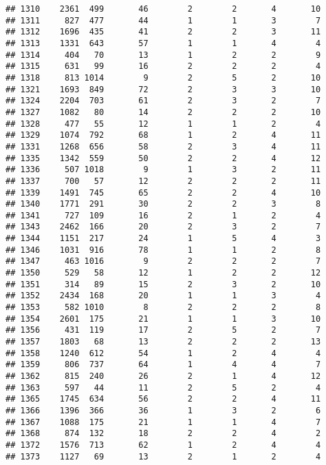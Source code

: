 \documentclass[]{article}
\begin{document}
\begin{verbatim}
## 1310    2361  499       46        2        2       4       10
## 1311     827  477       44        1        1       3        7
## 1312    1696  435       41        2        2       3       11
## 1313    1331  643       57        1        1       4        4
## 1314     404   70       13        1        2       2        9
## 1315     631   99       16        2        2       2        4
## 1318     813 1014        9        2        5       2       10
## 1321    1693  849       72        2        3       3       10
## 1324    2204  703       61        2        3       2        7
## 1327    1082   80       14        2        2       2       10
## 1328     477   55       12        1        1       2        4
## 1329    1074  792       68        1        2       4       11
## 1331    1268  656       58        2        3       4       11
## 1335    1342  559       50        2        2       4       12
## 1336     507 1018        9        1        3       2       11
## 1337     700   57       12        2        2       2       11
## 1339    1491  745       65        2        2       4       10
## 1340    1771  291       30        2        2       3        8
## 1341     727  109       16        2        1       2        4
## 1343    2462  166       20        2        3       2        7
## 1344    1151  217       24        1        5       4        3
## 1346    1031  916       78        1        1       2        8
## 1347     463 1016        9        2        2       2        7
## 1350     529   58       12        1        2       2       12
## 1351     314   89       15        2        3       2       10
## 1352    2434  168       20        1        1       3        4
## 1353     582 1010        8        2        2       2        8
## 1354    2601  175       21        1        1       3       10
## 1356     431  119       17        2        5       2        7
## 1357    1803   68       13        2        2       2       13
## 1358    1240  612       54        1        2       4        4
## 1359     806  737       64        1        4       4        7
## 1362     815  240       26        2        1       4       12
## 1363     597   44       11        2        5       2        4
## 1365    1745  634       56        2        2       4       11
## 1366    1396  366       36        1        3       2        6
## 1367    1088  175       21        1        1       4        7
## 1368     874  132       18        2        2       4        2
## 1372    1576  713       62        1        2       4        4
## 1373    1127   69       13        2        1       2        4

\end{verbatim}
\end{document}
